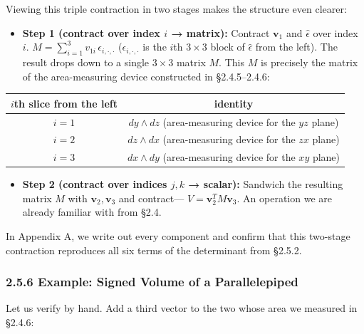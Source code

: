 Viewing this triple contraction in two stages makes the structure even
clearer:

\begin{itemize}
\tightlist
\item
  \textbf{Step 1 (contract over index $i$ → matrix):} Contract
  \(\mathbf{v}_1\) and \(\widehat{\epsilon}\) over index \(i\).
  \(\displaystyle M = \sum_{i=1}^3 v_{1i}\,\epsilon_{i,\cdot,\cdot}\)
  (\(\epsilon_{i,\cdot,\cdot}\) is the \(i\)th \(3 \times 3\) block of
  \(\widehat{\epsilon}\) from the left). The result drops down to a
  single \(3 \times 3\) matrix \(M\). This \(M\) is precisely the matrix
  of the area-measuring device constructed in §2.4.5--2.4.6:
\end{itemize}

\begin{longtable}[]{@{}cc@{}}
\toprule\noalign{}
\(i\)th slice from the left & identity \\
\midrule\noalign{}
\endhead
\bottomrule\noalign{}
\endlastfoot
\(i=1\) & \(dy \wedge dz\) (area-measuring device for the \(yz\)
plane) \\
\(i=2\) & \(dz \wedge dx\) (area-measuring device for the \(zx\)
plane) \\
\(i=3\) & \(dx \wedge dy\) (area-measuring device for the \(xy\)
plane) \\
\end{longtable}

\begin{itemize}
\tightlist
\item
  \textbf{Step 2 (contract over indices $j,k$ → scalar):} Sandwich the
  resulting matrix \(M\) with \(\mathbf{v}_2, \mathbf{v}_3\) and
  contract--- \(V = \mathbf{v}_2^T M \mathbf{v}_3\). An operation we are
  already familiar with from §2.4.
\end{itemize}

In Appendix A, we write out every component and confirm that this
two-stage contraction reproduces all six terms of the determinant from
§2.5.2.

\hypertarget{example-signed-volume-of-a-parallelepiped}{%
\subsubsection{2.5.6 Example: Signed Volume of a
Parallelepiped}\label{example-signed-volume-of-a-parallelepiped}}

Let us verify by hand. Add a third vector to the two whose area we
measured in §2.4.6:


